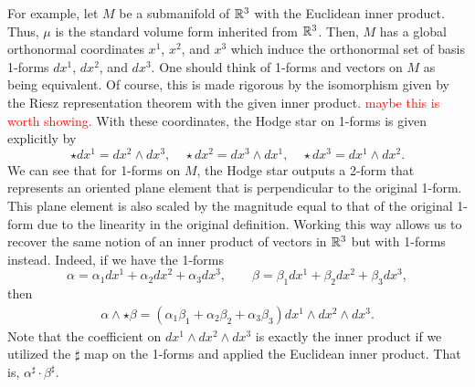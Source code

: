\documentclass[12pt]{article}
\begin{document}
For example, let $M$ be a submanifold of $\mathbb{R}^3$ with the Euclidean inner product.  Thus, $\mu$ is the standard volume form inherited from $\mathbb{R}^3$. Then, $M$ has a global orthonormal coordinates $x^1$, $x^2$, and $x^3$ which induce the orthonormal set of basis 1-forms  $dx^1$, $dx^2$, and $dx^3$. One should think of 1-forms and vectors on $M$ as being equivalent. Of course, this is made rigorous by the isomorphism given by the Riesz representation theorem with the given inner product. \textcolor{red}{maybe this is worth showing.} With these coordinates, the Hodge star on 1-forms is given explicitly by
\[
\star dx^1 = dx^2 \wedge dx^3, \quad \star dx^2 = dx^3 \wedge dx^1, \quad \star dx^3 = dx^1 \wedge dx^2.
\]
We can see that for 1-forms on $M$, the Hodge star outputs a 2-form that represents an oriented plane element that is perpendicular to the original 1-form. This plane element is also scaled by the magnitude equal to that of the original 1-form due to the linearity in the original definition.  Working this way allows us to recover the same notion of an inner product of vectors in $\mathbb{R}^3$ but with 1-forms instead.  Indeed, if we have the 1-forms
\[
\alpha = \alpha_1 dx^1 + \alpha_2 dx^2 + \alpha_3 dx^3, \qquad \beta = \beta_1 dx^1 + \beta_2 dx^2 + \beta_3 dx^3,
\]
then 
\begin{align*}
\alpha \wedge \star \beta = (\alpha_1 \beta_1 + \alpha_2 \beta_2 + \alpha_3 \beta_3)dx^1\wedge dx^2 \wedge dx^3.
\end{align*}
Note that the coefficient on $dx^1\wedge dx^2 \wedge dx^3$ is exactly the inner product if we utilized the $\sharp$ map on the 1-forms and applied the Euclidean inner product. That is, $\alpha^\sharp \cdot \beta^\sharp$.
\end{document}

